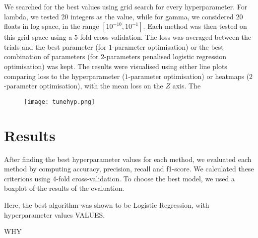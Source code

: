 \documentclass{article}
\begin{document}
	We searched for the best values using grid search for every hyperparameter. For lambda, we tested 20 integers as the value, while for gamma, we considered $20$ floats in log space, in the range $ [ 10^{-10}, 10^{-1}]$. Each method was then tested on this grid space using a $5$-fold cross validation. The loss was averaged between the trials and the best parameter (for $1$-parameter optimisation) or the best combination of parameters (for $2$-parameters penalised logistic regression optimisation) was kept. The results were visualised using either line plots comparing loss to the hyperparameter ($1$-parameter optimisation) or heatmaps ($2$-parameter optimisation), with the mean loss on the $Z$ axis. The 
	
	\begin{figure}
		\centering
		\texttt{[image: tunehyp.png]}
	\end{figure}
	
	
	
	\section{Results}
	After finding the best hyperparameter values for each method, we evaluated each method by computing accuracy, precision, recall and f1-score. We calculated these criterions using 4-fold cross-validation. To choose the best model, we used a boxplot of the results of the evaluation.
	
	Here, the best algorithm was shown to be Logistic Regression, with hyperparameter values VALUES.
	
	WHY
\end{document}
